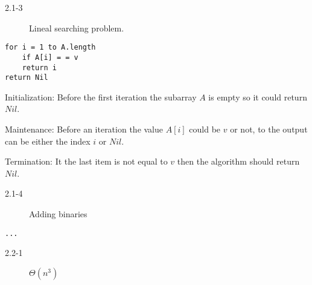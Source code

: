 \begin{description}
 \item[2.1-3] Lineal searching problem.
\end{description}

\begin{lstlisting}
for i = 1 to A.length
    if A[i] = = v
	return i
return Nil
\end{lstlisting}

\begin{list}{}{}
 \item[Initialization:] Before the first iteration the subarray $A$ is empty so it could return $Nil$.
 \item[Maintenance:] Before an iteration the value $A[i]$ could be $v$ or not, to the output can be either the index $i$ or $Nil$.
 \item[Termination:] It the last item is not equal to $v$ then the algorithm should return $Nil$.
\end{list}

\begin{description}
 \item[2.1-4] Adding binaries
\end{description}
\begin{lstlisting}
...
\end{lstlisting}


\begin{description}
 \item[2.2-1] $\Theta$$(n^3)$
\end{description}


